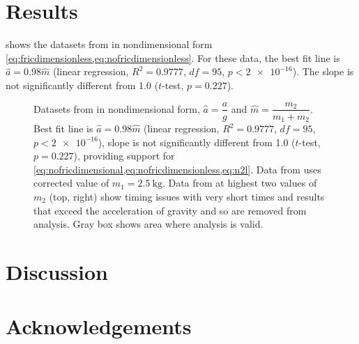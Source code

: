 \documentclass[reprint,amsmath,amssymb,aps,twoside]{revtex4-2}
\begin{document}
\section{Results}
 shows the datasets from \cite{arenas-2024-testing,avalur-2024-verifying,canada-2024-experimental,kishore-2024-relationship,yagnyeshwaran-2024-verifying,govardhanen-2024-newtons,kedharnath-2024-examining,krasnopolsky-2024-testing,perle-2024-experimental} in nondimensional form \cref{eq:fricdimensionless,eq:nofricdimensionless}. For these data, the best fit line is $\hat{a}=0.98\hat{m}$ (linear regression, $R^2=0.9777$, $df=95$, $p<\num{2e-16}$). The slope is not significantly different from 1.0 ($t$-test, $p=0.227$).
\begin{figure*}

\caption{\label{fig:results} Datasets from \cite{arenas-2024-testing,avalur-2024-verifying,canada-2024-experimental,kishore-2024-relationship,yagnyeshwaran-2024-verifying,govardhanen-2024-newtons,kedharnath-2024-examining,krasnopolsky-2024-testing,perle-2024-experimental} in nondimensional form, $\hat{a}=\dfrac{a}{g}$ and $\hat{m}=\dfrac{m_2}{m_1+m_2}$. Best fit line is $\hat{a}=0.98\hat{m}$ (linear regression, $R^2=0.9777$, $df=95$, $p<\num{2e-16}$), slope is not significantly different from 1.0 ($t$-test, $p=0.227$), providing support for \cref{eq:nofricdimensional,eq:nofricdimensionless,eq:n2l}. Data from \cite{govardhanen-2024-newtons} uses corrected value of $m_1=\qty{2.5}{\kilo\gram}$. Data from \cite{krasnopolsky-2024-testing} at highest two values of $m_2$ (top, right) show timing issues with very short times and results that exceed the acceleration of gravity and so are removed from analysis. Gray box shows area where analysis is valid.}
\end{figure*}

%

\section{Discussion}
\section{Acknowledgements}

\end{document}
